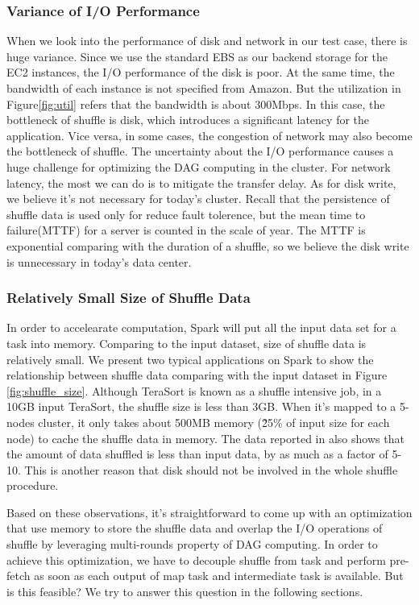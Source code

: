 \subsubsection{Variance of I/O Performance}
When we look into the performance of disk and network in our test case, there is huge variance. Since we use the standard EBS as our backend storage for the EC2 instances, the I/O performance of the disk is poor. 
At the same time, the bandwidth of each instance is not specified from Amazon. But the utilization in Figure\ref{fig:util} refers that the bandwidth is about 300Mbps. In this case, the bottleneck of shuffle is disk, which introduces a significant latency for the application. Vice versa, in some cases, the congestion of network may also become the bottleneck of shuffle\cite{varys}. The uncertainty about the I/O performance causes a huge challenge for optimizing the DAG computing in the cluster. For network latency, the most we can do is to mitigate the transfer delay. As for disk write, we believe it's not necessary for today's cluster. Recall that the persistence of shuffle data is used only for reduce fault tolerence, but the mean time to failure(MTTF) for a server is counted in the scale of year\cite{tachyon}. The MTTF is exponential comparing with the duration of a shuffle, so we believe the disk write is unnecessary in today's data center. 

\subsubsection{Relatively Small Size of Shuffle Data}\label{shufflesize}
In order to accelearate computation, Spark will put all the input data set for a task into memory. Comparing to the input dataset, size of shuffle data is relatively small. We present two typical applications on Spark to show the relationship between shuffle data comparing with the input dataset in Figure \ref{fig:shuffle_size}. Although TeraSort\cite{terasort} is known as a shuffle intensive job, in a 10GB input TeraSort, the shuffle size is less than 3GB. When it's mapped to a 5-nodes cluster, it only takes about 500MB memory (\~25\% of input size for each node) to cache the shuffle data in memory. The data reported in \cite{makingsense} also shows that the amount of data shuffled is less than input data, by as much as a factor of 5-10. This is another reason that disk should not be involved in the whole shuffle procedure.


Based on these observations, it's straightforward to come up with an optimization that use memory to store the shuffle data and overlap the I/O operations of shuffle
by leveraging multi-rounds property of DAG computing. In order to achieve this optimization, we have to decouple shuffle from task and 
perform pre-fetch as soon as each output of map task and intermediate task is available. But is this feasible? We try to answer this question
in the following sections.
